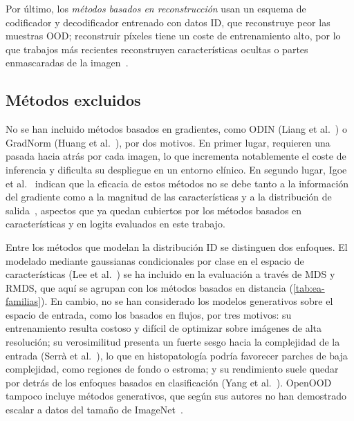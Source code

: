 Por último, los \emph{métodos basados en reconstrucción} usan un esquema de
codificador y decodificador entrenado con datos ID, que reconstruye peor las
muestras OOD; reconstruir píxeles tiene un coste de entrenamiento alto, por lo
que trabajos más recientes reconstruyen características ocultas o partes
enmascaradas de la imagen~\cite{yang2024}.

\subsection{Métodos excluidos}\label{sec:ea-excluidos}

No se han incluido métodos basados en gradientes, como ODIN (Liang et
al.~\cite{liang2018}) o GradNorm (Huang et al.~\cite{huang2021}), por dos motivos.
En primer lugar, requieren una pasada hacia atrás por cada imagen, lo que
incrementa notablemente el coste de inferencia y dificulta su despliegue en un
entorno clínico. En segundo lugar, Igoe et al.~\cite{igoe2022} indican que la
eficacia de estos métodos no se debe tanto a la información del gradiente como a
la magnitud de las características y a la distribución de salida~\cite{yang2024},
aspectos que ya quedan cubiertos por los métodos basados en características y en
logits evaluados en este trabajo.

Entre los métodos que modelan la distribución ID se distinguen dos enfoques. El
modelado mediante gaussianas condicionales por clase en el espacio de
características (Lee et al.~\cite{lee2018}) se ha incluido en la evaluación a
través de MDS y RMDS, que aquí se agrupan con los métodos basados en distancia
(\cref{tab:ea-familias}). En cambio, no se han considerado los modelos generativos
sobre el espacio de entrada, como los basados en flujos, por tres motivos: su
entrenamiento resulta costoso y difícil de optimizar sobre imágenes de alta
resolución; su verosimilitud presenta un fuerte sesgo hacia la complejidad de la
entrada (Serrà et al.~\cite{serra2020}), lo que en histopatología podría favorecer
parches de baja complejidad, como regiones de fondo o estroma; y su rendimiento
suele quedar por detrás de los enfoques basados en clasificación (Yang et
al.~\cite{yang2024}). OpenOOD tampoco incluye métodos generativos, que según sus
autores no han demostrado escalar a datos del tamaño de ImageNet~\cite{openood15}.

